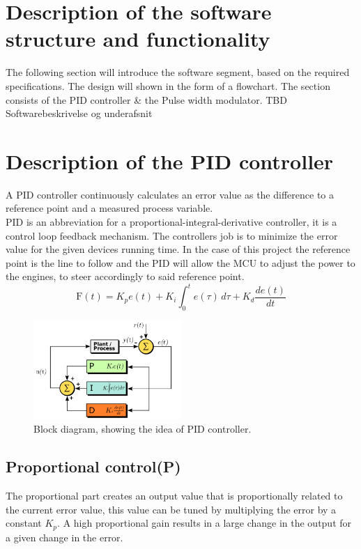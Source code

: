 \section{Description of the software structure and functionality}

The following section will introduce the software segment, based on the required specifications. The design will shown in the form of a flowchart.
The section consists of the PID controller \& the Pulse width modulator.
TBD Softwarebeskrivelse og underafsnit

\section {Description of the PID controller} 
A PID controller continuously calculates an error value as the difference to a reference point and a measured process variable.\\
PID is an abbreviation for a proportional-integral-derivative controller, it is a control loop feedback mechanism. The controllers job is to minimize the error value for the given devices running time. In the case of this project the reference point is the line to follow and the PID will allow the MCU to adjust the power to the engines, to steer accordingly to said reference point.
$$\mathrm{F}(t)=K_p{e(t)} + K_{i}\int_{0}^{t}{e(\tau)}\,{d\tau} + K_{d}\frac{de(t)}{dt}$$

\begin{figure}[h!]
  \centering
  \includegraphics[width=0.5\textwidth]{figures/PID_block.png}  
\caption{Block diagram, showing the idea of PID controller.}   
  \label{PID controller}
\end{figure}

\subsection {Proportional control(P)}

The proportional part creates an output value that is proportionally related to the current error value, this value can be tuned by multiplying the error by a constant $K_p$. A high proportional gain results in a large change in the output for a given change in the error. 


